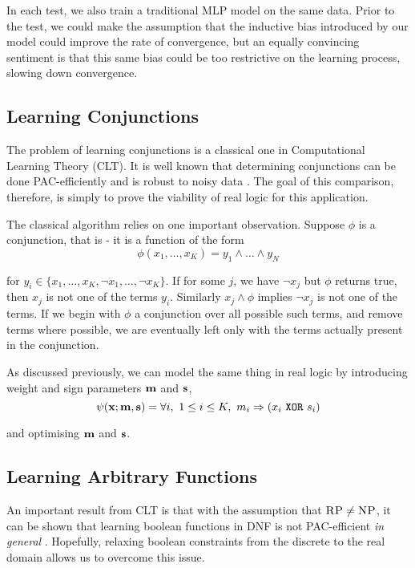 In each test, we also train a traditional MLP model on the same data. Prior to the test, we could make the assumption that the inductive bias introduced by our model could improve the rate of convergence, but an equally convincing sentiment is that this same bias could be too restrictive on the learning process, slowing down convergence.

\subsection{Learning Conjunctions}

The problem of learning conjunctions is a classical one in Computational Learning Theory (CLT). It is well known that determining conjunctions can be done PAC-efficiently \cite{clt} and is robust to noisy data \cite{noisyclt}. The goal of this comparison, therefore, is simply to prove the viability of real logic for this application.

The classical algorithm relies on one important observation. Suppose $\phi$ is a conjunction, that is - it is a function of the form 
$$\phi(x_1, \dots, x_K) = y_1 \land \dots \land y_N$$

for $y_i \in \{x_1, \dots, x_K, \lnot x_1, \dots, \lnot x_K\}$. If for some $j$, we have $\lnot x_j$ but $\phi$ returns true, then $x_j$ is not one of the terms $y_i$. Similarly $x_j \land \phi$ implies $\lnot x_j$ is not one of the terms. If we begin with $\phi$ a conjunction over all possible such terms, and remove terms where possible, we are eventually left only with the terms actually present in the conjunction.

As discussed previously, we can model the same thing in real logic by introducing weight and sign parameters $\mathbf{m}$ and $\mathbf{s}$, 
$$\psi(\mathbf{x}; \mathbf{m}, \mathbf{s}) = \forall i,\ 1 \leq i \leq K,\ m_i \Rightarrow (x_i \ \texttt{XOR}\  s_i)$$

and optimising $\mathbf{m}$ and $\mathbf{s}$.



\subsection{Learning Arbitrary Functions}

An important result from CLT is that with the assumption that $\textsc{RP} \neq \textsc{NP}$, it can be shown that learning boolean functions in DNF is not PAC-efficient \textit{in general} \cite{clt}. Hopefully, relaxing boolean constraints from the discrete to the real domain allows us to overcome this issue.

